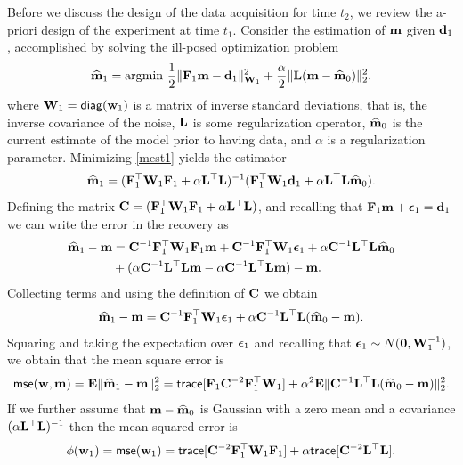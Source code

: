 \documentclass[11pt]{article}
\begin{document}
Before we discuss the design of the data acquisition for time $t_{2}$,
 we review the a-priori design of the experiment at time $t_{1}$.  
Consider  the estimation of ${\bf{m}}$ given ${\bf{d}}_{1}$,  accomplished by solving the ill-posed optimization problem
\begin{align}
\label{mest1}
\widehat {{\bf{m}}}_{1} = {\rm arg}{\min} \ \frac12 \| {\bf{F}}_{1} {\bf{m}} - {\bf{d}}_{1}\|^{2}_{{\bf{W}}_{1}} + {\frac {\alpha} 2}
\|{\bf{L}} ({\bf{m}} - {\widehat{{\bf{m}}}}_{0}) \|^{2}_2. 
\end{align}
where ${\bf{W}}_{1} = {\sf diag}({\bf{w}}_{1})$ is a matrix of inverse standard deviations, 
that is, the inverse covariance of the noise, ${\bf{L}}$ is some regularization operator, ${\widehat{{\bf{m}}}}_{0}$ is
the current estimate of the model prior to having data, and $\alpha$ is a regularization parameter.
Minimizing \eqref{mest1} yields the estimator
\begin{align}
\label{mest}
\widehat {{\bf{m}}}_{1} = ({\bf{F}}_{1}^{\top} {\bf{W}}_{1}{\bf{F}}_{1} + \alpha {\bf{L}}^{\top}{\bf{L}})^{-1} ({\bf{F}}_{1}^{\top} {\bf{W}}_{1} {\bf{d}}_{1}
+ \alpha {\bf{L}}^{\top}{\bf{L}} {\widehat{{\bf{m}}}}_{0}).
\end{align}
Defining the matrix ${\bf{C}} = ({\bf{F}}_{1}^{\top} {\bf{W}}_{1}{\bf{F}}_{1} + \alpha {\bf{L}}^{\top}{\bf{L}})$, and recalling that ${\bf{F}}_1{\bf{m}} + {\boldsymbol \epsilon}_1 = {\bf{d}}_1$ we can write
the error in the recovery as
\begin{align}
{\widehat{{\bf{m}}}}_1 -{\bf{m}} &= {\bf{C}}^{-1} {\bf{F}}_{1}^{\top} {\bf{W}}_{1}{\bf{F}}_{1} {\bf{m}} + {\bf{C}}^{-1} {\bf{F}}_{1}^{\top} {\bf{W}}_{1}{\boldsymbol \epsilon}_1 + \alpha
{\bf{C}}^{-1} {\bf{L}}^{\top}{\bf{L}} {\widehat{{\bf{m}}}}_{0} \\
\nonumber
&+ (\alpha {\bf{C}}^{-1} {\bf{L}}^{\top}{\bf{L}}{\bf{m}}
- \alpha {\bf{C}}^{-1} {\bf{L}}^{\top}{\bf{L}} {\bf{m}}) 
 -{\bf{m}}.
\end{align}
Collecting terms and using the definition of ${\bf{C}}$ we obtain
\begin{align}
\label{diffmod}
{\widehat{{\bf{m}}}}_1 -{\bf{m}} = {\bf{C}}^{-1} {\bf{F}}_{1}^{\top} {\bf{W}}_{1} {\boldsymbol \epsilon}_1 + \alpha {\bf{C}}^{-1} {\bf{L}}^{\top}{\bf{L}} ({\widehat{{\bf{m}}}}_{0} - {\bf{m}}).
\end{align}
Squaring and taking the expectation over ${\boldsymbol \epsilon}_1$ and recalling that $ {\boldsymbol \epsilon}_1 \sim N({\bf 0},{\bf{W}}_{1}^{-1})$, we obtain that the mean square error is
\begin{align}
{\sf mse}({\bf{w}},{\bf{m}}) = {\bf{E}}\| {\widehat{{\bf{m}}}}_1 -{\bf{m}} \|^{2}_2 = {\sf trace}[   {\bf{F}}_{1} {\bf{C}}^{-2} {\bf{F}}_{1}^{\top} {\bf{W}}_{1}]  + 
\alpha^2 {\bf{E}}\| {\bf{C}}^{-1} {\bf{L}}^{\top}{\bf{L}} ({\widehat{{\bf{m}}}}_{0} - {\bf{m}}) \|^{2}_2.
\end{align}
If we further assume that ${\bf{m}}-{\widehat{{\bf{m}}}}_{0}$ is Gaussian with a zero mean and a covariance
$(\alpha {\bf{L}}^{\top}{\bf{L}})^{-1}$ then the mean squared error is 
\begin{align}
\phi({\bf{w}}_1 ) = {\sf mse}({\bf{w}}_1) = {\sf trace}[    {\bf{C}}^{-2} {\bf{F}}_{1}^{\top}{\bf{W}}_{1}{\bf{F}}_{1}]  + 
 \alpha {\sf trace} [{\bf{C}}^{-2} {\bf{L}}^{\top}{\bf{L}}]. 
\end{align}
\end{document}
